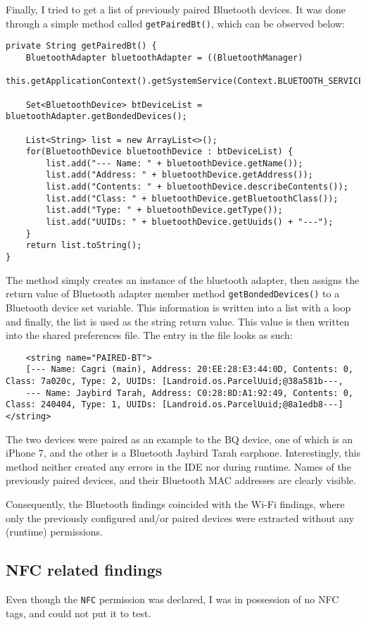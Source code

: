 \documentclass[
  a4paper,  %
  twoside,  %
  bibliography=totoc,
  headsepline,
  cleardoublepage=empty,
  parskip=half,
  draft=false,
  open=any
]{scrbook}
\begin{document}
Finally, I tried to get a list of previously paired Bluetooth devices. It was done through a simple method called \texttt{getPairedBt()}, which can be observed below:
\begin{lstlisting}
private String getPairedBt() {
	BluetoothAdapter bluetoothAdapter = ((BluetoothManager)
	this.getApplicationContext().getSystemService(Context.BLUETOOTH_SERVICE)).getAdapter();
	
	Set<BluetoothDevice> btDeviceList = bluetoothAdapter.getBondedDevices();
	
	List<String> list = new ArrayList<>();
	for(BluetoothDevice bluetoothDevice : btDeviceList) {
		list.add("--- Name: " + bluetoothDevice.getName());
		list.add("Address: " + bluetoothDevice.getAddress());
		list.add("Contents: " + bluetoothDevice.describeContents());
		list.add("Class: " + bluetoothDevice.getBluetoothClass());
		list.add("Type: " + bluetoothDevice.getType());
		list.add("UUIDs: " + bluetoothDevice.getUuids() + "---");
	}
	return list.toString();
}
\end{lstlisting}
The method simply creates an instance of the bluetooth adapter, then assigns the return value of Bluetooth adapter member method \texttt{getBondedDevices()} to a Bluetooth device set variable. This information is written into a list with a loop and finally, the list is used as the string return value. This value is then written into the shared preferences file. The entry in the file looks as such:
\begin{lstlisting}
    <string name="PAIRED-BT">
    [--- Name: Cagri (main), Address: 20:EE:28:E3:44:0D, Contents: 0, Class: 7a020c, Type: 2, UUIDs: [Landroid.os.ParcelUuid;@38a581b---, 
    --- Name: Jaybird Tarah, Address: C0:28:8D:A1:92:49, Contents: 0, Class: 240404, Type: 1, UUIDs: [Landroid.os.ParcelUuid;@8a1edb8---]</string>
\end{lstlisting}
The two devices were paired as an example to the BQ device, one of which is an iPhone 7, and the other is a Bluetooth Jaybird Tarah earphone. Interestingly, this method neither created any errors in the IDE nor during runtime. Names of the previously paired devices, and their Bluetooth MAC addresses are clearly visible. 

Consequently, the Bluetooth findings coincided with the Wi-Fi findings, where only the previously configured and/or paired devices were extracted without any (runtime) permissions.

\subsection{NFC related findings}
Even though the \texttt{NFC} permission was declared, I was in possession of no NFC tags, and could not put it to test.
\end{document}
